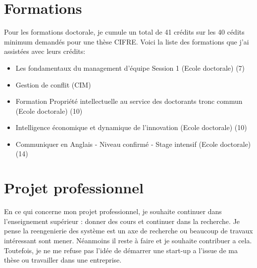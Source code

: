 \documentclass[a4paper]{article}
\begin{document}
\section{Formations}
Pour les formations doctorale, je cumule un  total de 41 crédits sur les 40 cédits minimum demandés pour une thèse CIFRE. 
Voici la liste des formations que j'ai assistées  avec leurs crédits:
\begin{itemize}
\item Les fondamentaux du management d’équipe Session 1 (Ecole doctorale)  (7)
\item Gestion de conflit (CIM) 
\item Formation Propriété intellectuelle au service des doctorants tronc commun (Ecole doctorale) (10)
\item Intelligence économique et dynamique de l'innovation (Ecole doctorale) (10)
\item Communiquer en Anglais - Niveau confirmé - Stage intensif (Ecole doctorale) (14)
\end{itemize}

\section{Projet professionnel}
En ce qui concerne mon projet professionnel, je souhaite continuer dans l'enseignement supérieur : donner des cours et continuer dans la recherche.
Je pense la reengenierie des système est un axe de recherche ou beaucoup de travaux intéressant sont mener. Néanmoins il reste à faire et je souhaite contribuer a cela.
Toutefois, je ne me refuse pas l'idée de démarrer une start-up a l'issue de ma thèse ou travailler dans une entreprise.

\footnotesize{
 

}
\end{document}
